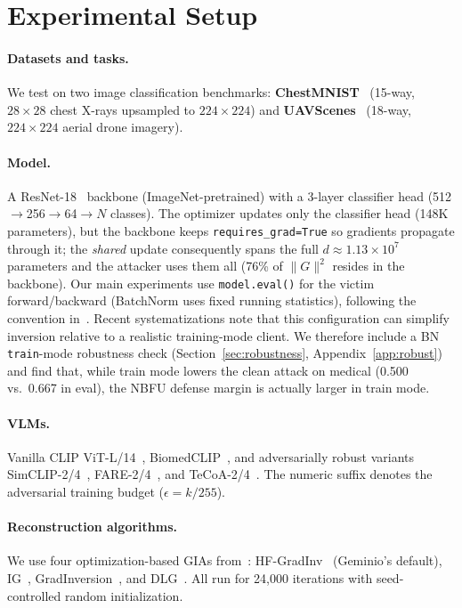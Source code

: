 \documentclass[11pt]{article}
\begin{document}
\section{Experimental Setup}
\label{sec:setup}

\paragraph{Datasets and tasks.}
We test on two image classification benchmarks: \textbf{ChestMNIST}~\citep{medmnistv2} (15-way, $28{\times}28$ chest X-rays upsampled to $224{\times}224$) and \textbf{UAVScenes}~\citep{uavscenes2024} (18-way, $224{\times}224$ aerial drone imagery).

\paragraph{Model.}
A ResNet-18~\citep{resnet2016} backbone (ImageNet-pretrained) with a 3-layer classifier head (512$\to$256$\to$64$\to N$ classes). The optimizer updates only the classifier head (148K parameters), but the backbone keeps \texttt{requires\_grad=True} so gradients propagate through it; the \emph{shared} update consequently spans the full $d \approx 1.13{\times}10^{7}$ parameters and the attacker uses them all (76\% of $\|G\|^2$ resides in the backbone). Our main experiments use \texttt{model.eval()} for the victim forward/backward (BatchNorm uses fixed running statistics), following the convention in~\citet{breaching2023}. Recent systematizations note that this configuration can simplify inversion relative to a realistic training-mode client. We therefore include a BN \texttt{train}-mode robustness check (Section~\ref{sec:robustness}, Appendix~\ref{app:robust}) and find that, while train mode lowers the clean attack on medical (0.500 vs.\ 0.667 in eval), the NBFU defense margin is actually larger in train mode.

\paragraph{VLMs.}
Vanilla CLIP ViT-L/14~\citep{clip2021}, BiomedCLIP~\citep{biomedclip2023}, and adversarially robust variants SimCLIP-2/4~\citep{simclip2024}, FARE-2/4~\citep{fare2024}, and TeCoA-2/4~\citep{tecoa2023}. The numeric suffix denotes the adversarial training budget ($\epsilon = k/255$).

\paragraph{Reconstruction algorithms.}
We use four optimization-based GIAs from~\citet{breaching2023}: HF-GradInv~\citep{hfgradinv2024} (Geminio's default), IG~\citep{ig2020}, GradInversion~\citep{gradinversion2021,deepinversion2020}, and DLG~\citep{dlg2019,idlg2020}. All run for 24{,}000 iterations with seed-controlled random initialization.
\end{document}
